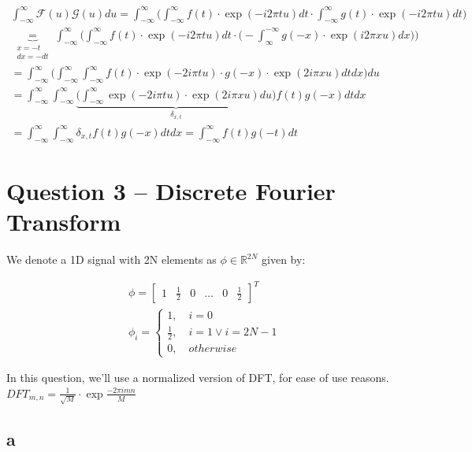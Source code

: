 \documentclass[english]{extarticle}
\numberwithin{equation}{section}
\numberwithin{figure}{section}
\begin{document}
\begin{align*}
    \int_{-\infty}^{\infty} \mathcal{F}(u) \mathcal{G} (u) du = \int_{-\infty}^{\infty} \Bigg( \int_{-\infty}^{\infty} f(t)\cdot \exp(-i 2\pi t u) dt \cdot \int_{-\infty}^{\infty} g(t)\cdot \exp(-i 2\pi t u) dt \Bigg) \\
    \underbrace{=}_{\substack{x=-t \\ dx = -dt}} \int_{-\infty}^{\infty} \Bigg( \int_{-\infty}^{\infty} f(t)\cdot \exp(-i 2\pi t u) dt \cdot \Big( - \int_{\infty}^{-\infty} g(-x)\cdot \exp(i 2\pi x u) dx \Big) \Bigg) \\
    = \int_{-\infty}^{\infty} \Bigg( \int_{-\infty}^{\infty} \int_{-\infty}^{\infty} f(t)\cdot \exp(-2i\pi tu) \cdot g(-x) \cdot \exp(2i\pi xu) dt dx \Bigg) du \\
    = \int_{-\infty}^{\infty} \int_{-\infty}^{\infty} \underbrace{\Big( \int_{-\infty}^{\infty} \exp(-2i\pi tu) \cdot \exp(2i\pi xu) du \Big)}_{\delta_{x,t}} f(t)g(-x) dt dx \\
    = \int_{-\infty}^{\infty} \int_{-\infty}^{\infty} \delta_{x,t} f(t) g(-x) dt dx = \int_{-\infty}^{\infty} f(t) g(-t) dt
\end{align*}

\newpage
\section*{Question 3 -- Discrete Fourier Transform}

We denote a 1D signal with 2N elements as $\phi \in \mathbb{R}^{2N}$ given by:

\begin{align*}
    \phi = \begin{bmatrix} 1 & \frac{1}{2} & 0 & \dots & 0 & \frac{1}{2} \end{bmatrix}^T \\
    \phi_{i} = 
    \begin{cases} 
    1, \quad i = 0 \\
    \frac{1}{2}, \quad i = 1 \lor i = 2N-1 \\
    0, \quad otherwise
    \end{cases}
\end{align*}

In this question, we'll use a normalized version of DFT, for ease of use reasons. $DFT_{m,n}=\frac{1}{\sqrt{M}}\cdot \exp{\frac{-2\pi imn}{M}}$

\subsection*{a}
\end{document}
